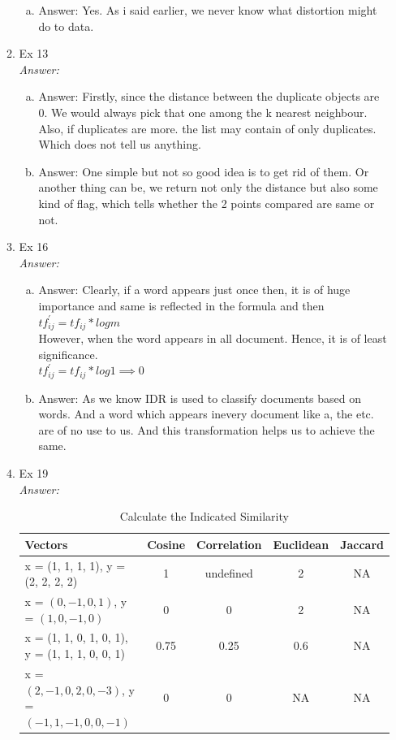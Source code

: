 \documentclass{article}
\begin{document}
\begin{enumerate}
\begin{enumerate}
\begin{enumerate}[(a)]
				\item 
				Answer: Yes. As i said earlier, we never know what distortion might do to data.
			\end{enumerate}

			\item Ex 13\\
			\emph{Answer:}
			\begin{enumerate}[(a)]
				\item 
				Answer: Firstly, since the distance between the duplicate objects are 0. We would always pick that one among the k nearest 
				neighbour. Also, if duplicates are more. the list may contain of only duplicates. Which does not tell us anything.
				
				\item 
				Answer: One simple but not so good idea is to get rid of them. Or another thing can be, we return not only the distance but also
				some kind of flag, which tells whether the 2 points compared are same or not. 
			\end{enumerate}
			
			\item Ex 16\\
			\emph{Answer:}
			\begin{enumerate}[(a)]
				\item 
				Answer: Clearly, if a word appears just once then, it is of huge importance and same is reflected in the formula and then \\
				$tf^{\prime}_{ij} = tf_{ij} * log m$ \\
				However, when the word appears in all document. Hence, it is of least significance.\\
				$tf^{\prime}_{ij} = tf_{ij} * log 1 \implies 0$\\
				
				\item 
				Answer: As we know IDR is used to classify documents based on words. And a word which appears inevery document like a, the etc. 
				are of no use to us. And this transformation helps us to achieve the same.
			\end{enumerate}
			
			\item Ex 19\\
			\emph{Answer:}
			\begin{table}[h]
					\caption{Calculate the Indicated Similarity} 
					\centering
					\begin{tabular}{l cccc}
						\hline
						Vectors& Cosine & Correlation & Euclidean& Jaccard\\
						\hline
						x = (1, 1, 1, 1), y = (2, 2, 2, 2) & 1 & undefined & 2 & NA\\
						x = $(0,{-}1, 0, 1)$, y = $(1, 0,{-}1, 0)$ & 0 & 0 & 2 & NA\\
						x = (1, 1, 0, 1, 0, 1), y = (1, 1, 1, 0, 0, 1) & 0.75 & 0.25 & 0.6 & NA\\
						x = $(2,{-}1, 0, 2, 0,{-}3)$, y = $({-}1, 1,{-}1, 0, 0,{-}1)$& 0 & 0 & NA & NA\\


\end{tabular}
\end{table}
\end{enumerate}
\end{enumerate}
\end{document}
